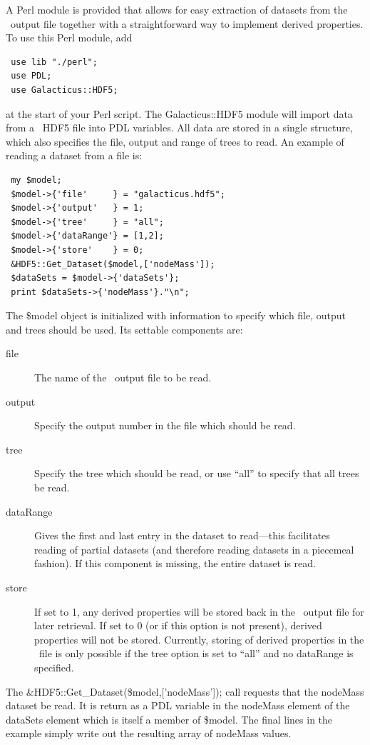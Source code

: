 A Perl module is provided that allows for easy extraction of datasets from the \glc\ output file together with a straightforward way to implement derived properties. To use this Perl module, add
\begin{verbatim}
 use lib "./perl";
 use PDL;
 use Galacticus::HDF5;
\end{verbatim}
at the start of your Perl script. The {\normalfont \ttfamily Galacticus::HDF5} module will import data from a \glc\ HDF5 file into PDL variables. All data are stored in a single structure, which also specifies the file, output and range of trees to read. An example of reading a dataset from a file is:
\begin{verbatim}
 my $model;
 $model->{'file'     } = "galacticus.hdf5";
 $model->{'output'   } = 1;
 $model->{'tree'     } = "all";
 $model->{'dataRange'} = [1,2];
 $model->{'store'    } = 0;
 &HDF5::Get_Dataset($model,['nodeMass']);
 $dataSets = $model->{'dataSets'};
 print $dataSets->{'nodeMass'}."\n";
\end{verbatim}
The {\normalfont \ttfamily \$model} object is initialized with information to specify which file, output and trees should be used. Its settable components are:
\begin{description}
 \item [{\normalfont \ttfamily file}] The name of the \glc\ output file to be read.
 \item [{\normalfont \ttfamily output}] Specify the output number in the file which should be read.
 \item [{\normalfont \ttfamily tree}] Specify the tree which should be read, or use ``all'' to specify that all trees be read.
 \item [{\normalfont \ttfamily dataRange}] Gives the first and last entry in the dataset to read---this facilitates reading of partial datasets (and therefore reading datasets in a piecemeal fashion). If this component is missing, the entire dataset is read.
 \item[{\normalfont \ttfamily store}] If set to 1, any derived properties will be stored back in the \glc\ output file for later retrieval. If set to 0 (or if this option is not present), derived properties will not be stored. Currently, storing of derived properties in the \glc\ file is only possible if the {\normalfont \ttfamily tree} option is set to ``all'' and no {\normalfont \ttfamily dataRange} is specified.
\end{description}
The {\normalfont \ttfamily \&HDF5::Get\_Dataset(\$model,['nodeMass']);} call requests that the {\normalfont \ttfamily nodeMass} dataset be read. It is return as a PDL variable in the {\normalfont \ttfamily nodeMass} element of the {\normalfont \ttfamily dataSets} element which is itself a member of {\normalfont \ttfamily \$model}. The final lines in the example simply write out the resulting array of {\normalfont \ttfamily nodeMass} values.

